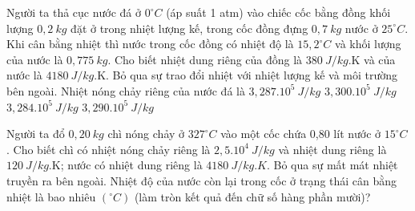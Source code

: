 \begin{ex} 
	Người ta thả cục nước đá ở $0^\circ C$ (áp suất 1 atm) vào chiếc cốc bằng đồng khối lượng $0,2 \ kg$ đặt ở trong nhiệt lượng kế, trong cốc đồng đựng $0,7 \ kg$ nước ở $25^\circ C$. Khi cân bằng nhiệt thì nước trong cốc đồng có nhiệt độ là $15,2^\circ C$ và khối lượng của nước là $0,775 \ kg$. Cho biết nhiệt dung riêng của đồng là $380 \ J /kg$.K và của nước là $4180 \ J /kg$.K. Bỏ qua sự trao đổi nhiệt với nhiệt lượng kế và môi trường bên ngoài. Nhiệt nóng chảy riêng của nước đá là 
	\choice
	{\True $3,287.10^5\ J / kg$}
	{$3,300.10^5\ J / kg$}
	{$3,284.10^5\ J / kg$}
	{$3,290.10^5\ J / kg$}
\end{ex}
\begin{ex} 
	Người ta đổ $0,20 \ kg$ chì nóng chảy ở $327^\circ C$ vào một cốc chứa 0,80 lít nước ở $15^\circ C$. Cho biết chì có nhiệt nóng chảy riêng là $2,5.10^{4} \ J /kg$ và nhiệt dung riêng là $120 \ J /kg$.K; nước có nhiệt dung riêng là $4180 \ J /kg.K$. Bỏ qua sự mất mát nhiệt truyền ra bên ngoài. Nhiệt độ của nước còn lại trong cốc ở trạng thái cân bằng nhiệt là bao nhiêu $\left({}^\circ C\right)$ (làm tròn kết quả đến chữ số hàng phần mười)? 
\end{ex}







